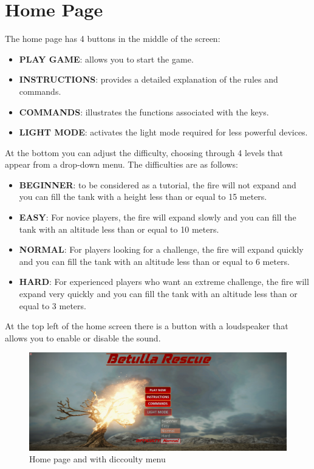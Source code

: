 \documentclass{article}
\begin{document}
\section*{Home Page}
The home page has 4 buttons in the middle of the screen: 
\begin{itemize}
\item \textbf{PLAY GAME}: allows you to start the game.
\item \textbf{INSTRUCTIONS}: provides a detailed explanation of the rules and commands.
\item \textbf{COMMANDS}: illustrates the functions associated with the keys.
\item \textbf{LIGHT MODE}: activates the light mode required for less powerful devices.
\end{itemize}
At the bottom you can adjust the difficulty, choosing through 4 levels that appear from a drop-down menu. The difficulties are as follows:
\begin{itemize}
\item \textbf{BEGINNER}: to be considered as a tutorial, the fire will not expand and you can fill the tank with a height less than or equal to 15 meters.
\item \textbf{EASY}: For novice players, the fire will expand slowly and you can fill the tank with an altitude less than or equal to 10 meters.
\item \textbf{NORMAL}: For players looking for a challenge, the fire will expand quickly and you can fill the tank with an altitude less than or equal to 6 meters.
\item \textbf{HARD}: For experienced players who want an extreme challenge, the fire will expand very quickly and you can fill the tank with an altitude less than or equal to 3 meters.
\end{itemize}
At the top left of the home screen there is a button with a loudspeaker that allows you to enable or disable the sound.

\begin{figure}[h!]
  \includegraphics[width=\linewidth]{initial.png}
  \caption{Home page and with diccoulty menu}
\end{figure}
 
\end{document}
